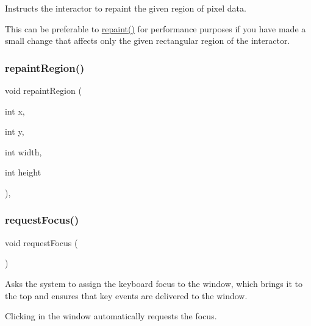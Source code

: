Instructs the interactor to repaint the given region of pixel data. 

This can be preferable to \mbox{\hyperlink{classGDrawingSurface_a4a8ae47b42f1e6a41b65d3546df46218}{repaint()}} for performance purposes if you have made a small change that affects only the given rectangular region of the interactor. \mbox{\label{classGForwardDrawingSurface_a63af8fca5bf186367132ecf6af6f5eea}} 
\subsubsection{\texorpdfstring{repaint\+Region()}{repaintRegion()}\hspace{0.1cm}{\footnotesize\ttfamily [2/2]}}
{\footnotesize\ttfamily void repaint\+Region (\begin{DoxyParamCaption}\item[{int}]{x,  }\item[{int}]{y,  }\item[{int}]{width,  }\item[{int}]{height }\end{DoxyParamCaption})\hspace{0.3cm}{\ttfamily [override]}, {\ttfamily [inherited]}}

\mbox{\label{classGWindow_a519fb2ac767f8b2febbb50b898b8c8cb}} 
\subsubsection{\texorpdfstring{request\+Focus()}{requestFocus()}}
{\footnotesize\ttfamily void request\+Focus (\begin{DoxyParamCaption}{ }\end{DoxyParamCaption})\hspace{0.3cm}{\ttfamily [virtual]}}



Asks the system to assign the keyboard focus to the window, which brings it to the top and ensures that key events are delivered to the window. 

Clicking in the window automatically requests the focus. \mbox{\label{classGWindow_afd3595051be2709847c2de4352f27cf5}} 
